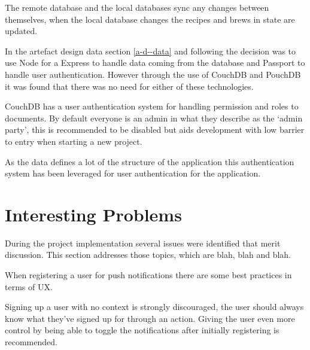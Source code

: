 The remote database and the local databases sync any changes between themselves, when the local database changes the recipes and brews in state are updated.

In the artefact design data section \ref{a-d--data} and following the decision was to use Node for a Express to handle data coming from the database and Passport to handle user authentication. However through the use of CouchDB and PouchDB it was found that there was no need for either of these technologies.

CouchDB has a user authentication system for handling permission and roles to documents. By default everyone is an admin in what they describe as the `admin party', this is recommended to be disabled but aids development with low barrier to entry when starting a new project.

As the data defines a lot of the structure of the application this authentication system has been leveraged for user authentication for the application.


\section{Interesting Problems} \label{s-i--interesting-problems}


During the project implementation several issues were identified that merit discussion. This section addresses those topics, which are blah, blah and blah.


When registering a user for push notifications there are some best practices in terms of UX.

Signing up a user with no context is strongly discouraged, the user should always know what they've signed up for through an action. Giving the user even more control by being able to toggle the notifications after initially registering is recommended. \cite{best_practises_push_notifications}



